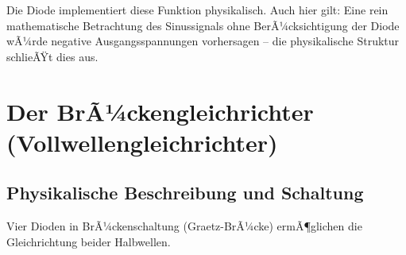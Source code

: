﻿\documentclass[12pt, a4paper]{article}
\begin{document}
	Die Diode implementiert diese Funktion physikalisch. Auch hier gilt: Eine rein mathematische Betrachtung des Sinussignals ohne BerÃ¼cksichtigung der Diode wÃ¼rde negative Ausgangsspannungen vorhersagen -- die physikalische Struktur schlieÃŸt dies aus.
	
	\section{Der BrÃ¼ckengleichrichter (Vollwellengleichrichter)}
	
	\subsection{Physikalische Beschreibung und Schaltung}
	
	Vier Dioden in BrÃ¼ckenschaltung (Graetz-BrÃ¼cke) ermÃ¶glichen die Gleichrichtung beider Halbwellen.
	
\end{document}
